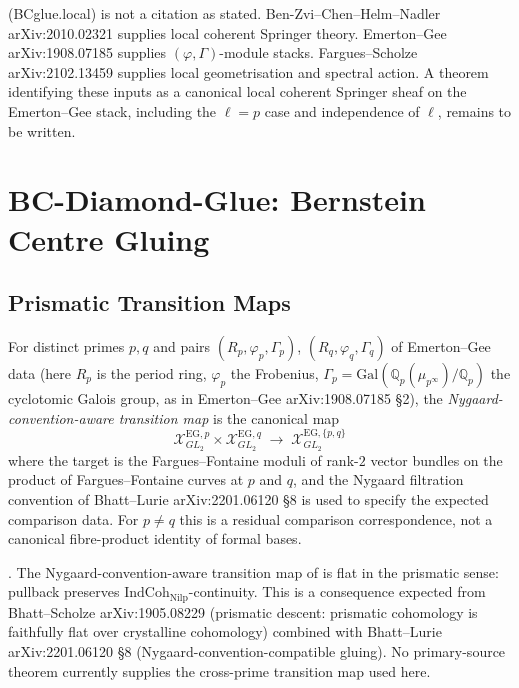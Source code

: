 \begin{remark}
\label{v4-arith:bcglue-k5:rem:domain-local}
(BCglue.local) is not a citation as stated. Ben-Zvi--Chen--Helm--Nadler
arXiv:2010.02321
supplies local coherent Springer theory. Emerton--Gee
arXiv:1908.07185 supplies \((\varphi,\Gamma)\)-module stacks.
Fargues--Scholze arXiv:2102.13459 supplies local geometrisation and
spectral action. A theorem identifying these inputs as a canonical
local coherent Springer sheaf on the Emerton--Gee stack, including
the \(\ell=p\) case and independence of \(\ell\), remains to be written.
\end{remark}

\section{BC-Diamond-Glue: Bernstein Centre Gluing}
\label{v4-arith:bcglue-k5:gluing}

\subsection{Prismatic Transition Maps}

\begin{definition}
\label{v4-arith:bcglue-k5:def:nygaard-transition}
For distinct primes \(p,q\) and pairs
\((R_{p},\varphi_{p},\Gamma_{p})\), \((R_{q},\varphi_{q},\Gamma_{q})\)
of Emerton--Gee data (here \(R_{p}\) is the period ring,
\(\varphi_{p}\) the Frobenius, \(\Gamma_{p}=\mathrm{Gal}(\mathbb{Q}_{p}(\mu_{p^{\infty}})/\mathbb{Q}_{p})\)
the cyclotomic Galois group, as in Emerton--Gee arXiv:1908.07185 \S2),
the \emph{Nygaard-convention-aware transition
map} is the canonical map
\[
\mathcal{X}^{\mathrm{EG},p}_{GL_{2}}\times\mathcal{X}^{\mathrm{EG},q}_{GL_{2}}\;\to\;\mathcal{X}^{\mathrm{EG},\{p,q\}}_{GL_{2}}
\]
where the target is the Fargues--Fontaine moduli of rank-\(2\) vector
bundles on the product of Fargues--Fontaine curves at \(p\) and \(q\),
and the Nygaard filtration convention of Bhatt--Lurie
arXiv:2201.06120 \S8 is used to specify the expected comparison data.
For \(p\neq q\) this is a residual comparison correspondence, not a
canonical fibre-product identity of formal bases.
\end{definition}

\begin{lemma}
\label{v4-arith:bcglue-k5:lem:prismatic-flatness}
\ClaimStatusConjectured. The Nygaard-convention-aware
transition map of 
is flat in the prismatic sense: pullback preserves
\(\mathrm{IndCoh}_{\mathrm{Nilp}}\)-continuity. This is a consequence
expected from Bhatt--Scholze arXiv:1905.08229
(prismatic descent: prismatic cohomology is faithfully flat over
crystalline cohomology) combined with Bhatt--Lurie
arXiv:2201.06120 \S8 (Nygaard-convention-compatible gluing). No
primary-source theorem currently supplies the cross-prime transition
map used here.
\end{lemma}

